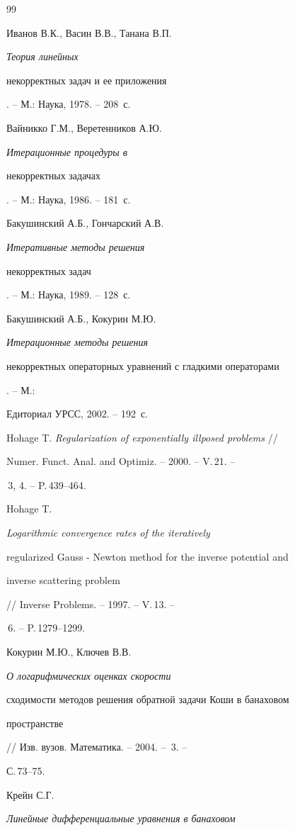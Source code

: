 \begin{thebibliography}{99}







Иванов В.К., Васин В.В., Танана В.П. {\em Теория линейных


некорректных задач и ее приложения}. -- М.: Наука, 1978. -- 208~с.




Вайникко Г.М., Веретенников А.Ю. {\em Итерационные процедуры в


некорректных задачах}. -- М.: Наука, 1986. -- 181~с.




Бакушинский А.Б., Гончарский А.В. {\em Итеративные методы решения


некорректных задач}. -- М.: Наука, 1989. -- 128~с.




Бакушинский А.Б., Кокурин М.Ю. {\em Итерационные методы решения


некорректных операторных уравнений с гладкими операторами}. -- М.:


Едиториал УРСС, 2002. -- 192~с.




Hohage T. {\em Regularization of exponentially illposed problems} //


Numer. Funct. Anal. and Optimiz. -- 2000. -- V.\,21. --


\No\No\,3, 4. -- P.\,439--464.




Hohage T. {\em Logarithmic convergence rates of the iteratively


regularized Gauss - Newton method for the inverse potential and


inverse scattering problem} // Inverse Problems. -- 1997. -- V.\,13. --


\No\,6. -- P.\,1279--1299.




Кокурин М.Ю., Ключев В.В. {\em О логарифмических оценках скорости


сходимости методов решения обратной задачи Коши в банаховом


пространстве} // Изв. вузов. Математика. -- 2004. -- \No\,3. --


С.\,73--75.




Крейн С.Г. {\em Линейные дифференциальные уравнения в банаховом


}
\end{thebibliography}
